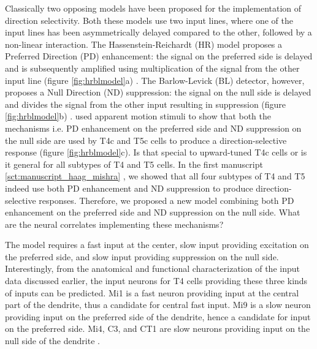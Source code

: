 Classically two opposing models have been proposed for the implementation of direction selectivity. Both these models use two input lines, where one of the input lines has been asymmetrically delayed compared to the other, followed by a non-linear interaction. The Hassenstein-Reichardt (HR) model proposes a Preferred Direction (PD) enhancement: the signal on the preferred side is delayed and is subsequently amplified using multiplication of the signal from the other input line (figure \ref{fig:hrblmodel}a) \parencite{Hassenstein1956}. The Barlow-Levick (BL) detector, however, proposes a Null Direction (ND) suppression: the signal on the null side is delayed and divides the signal from the other input resulting in suppression (figure \ref{fig:hrblmodel}b) \parencite{Barlow1965}. \cite{Haag2016} used apparent motion stimuli to show that both the mechanisms i.e. PD enhancement on the preferred side and ND suppression on the null side are used by T4c and T5c cells to produce a direction-selective response (figure \ref{fig:hrblmodel}c). Is that special to upward-tuned T4c cells or is it general for all subtypes of T4 and T5 cells. In the first manuscript \ref{sct:manuscript_haag_mishra} \parencite{Haag2017}, we showed that all four subtypes of T4 and T5 indeed use both PD enhancement and ND suppression to produce direction-selective responses. Therefore, we proposed a new model combining both PD enhancement on the preferred side and ND suppression on the null side. What are the neural correlates implementing these mechanisms? 

The model requires a fast input at the center, slow input providing excitation on the preferred side, and slow input providing suppression on the null side. Interestingly, from the anatomical and functional characterization of the input data discussed earlier, the input neurons for T4 cells providing these three kinds of inputs can be predicted. Mi1 is a fast neuron providing input at the central part of the dendrite, thus a candidate for central fast input. Mi9 is a slow neuron providing input on the preferred side of the dendrite, hence a candidate for input on the preferred side. Mi4, C3, and CT1 are slow neurons providing input on the null side of the dendrite \parencite{Arenz2017}. 

